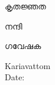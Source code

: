 \newpage
\thispagestyle{empty}

\begin{center}

\huge{കൃതജ്ഞത}
\\[0.5cm]

\end{center}

\normalsize നന്ദി \\[1.0cm]


\vspace{.5in}


\begin{flushright}
ഗവേഷക

\end{flushright}

\begin{flushleft}
Kariavattom\\
Date:
\end{flushleft}
